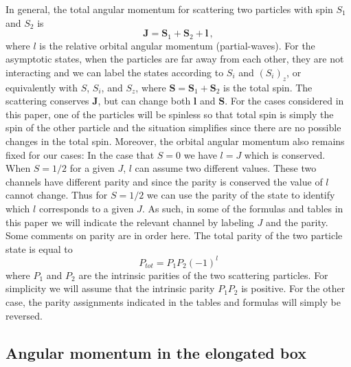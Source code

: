 \documentclass[aps,prd,reprint,showpacs,floatfix,longbibliography,,superscriptaddress]{revtex4-1}
\def\beq{\begin{equation}}
\def\eeq{\end{equation}}
\begin{document}
\begin{widetext}
In general, the total angular momentum for scattering two particles with spin $S_1$ and 
$S_2$ is 
\beq 
\bm J= \bm S_1 + \bm S_2 + \bm l \,, \label{eq:Jsum} 
\eeq 
where $l$ is the relative orbital angular momentum (partial-waves).
For the asymptotic states, when the particles are far away from each other, they are not 
interacting and we can label the states according to $S_i$ and $(S_i)_z$,
or equivalently with $S$, $S_i$, and $S_z$, where $\bm S=\bm S_1+\bm S_2$ is the total spin.
The scattering conserves $\bm J$, but can change both $\bm l$ and $\bm S$. 
For the cases considered in this
paper, one of the particles will be spinless so that total spin is simply the spin of the other
particle and the situation simplifies since there are no possible changes in the total spin. 
Moreover, the orbital angular momentum also remains fixed for our cases:
In the case that $S=0$ we have $l=J$ which is conserved. When $S=1/2$ for a given $J$, 
$l$ can assume two different values. These two channels have different parity and since
the parity is conserved the value of $l$ cannot change. Thus for $S=1/2$ we can use the 
parity of the state to identify which $l$ corresponds
to a given $J$. As such, in some of the formulas and tables in this paper we will
indicate the relevant channel by labeling $J$ and the parity.
Some comments on parity are in order here.
The total parity of the two particle state is equal to 
\beq P_{tot}=P_1P_2 (-1)^l \eeq 
where $P_1$ and $P_2$ are the intrinsic parities of the two scattering particles. For simplicity
we will assume that the intrinsic parity $P_1 P_2$ is positive. For the other case, the parity
assignments indicated in the tables and formulas will simply be reversed. 



\subsection{Angular momentum in the elongated box}
\label{sec:ang_elongated}


\end{widetext}
\end{document}

